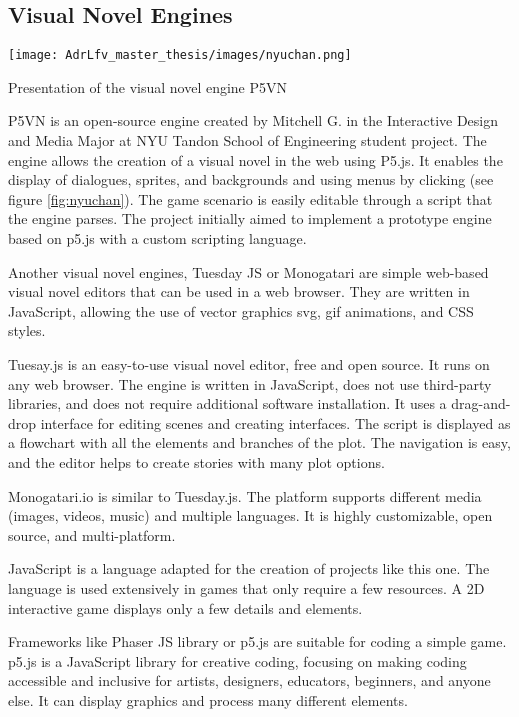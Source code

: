 \subsection{Visual Novel Engines}

\begin{marginfigure}
    \centering
    \texttt{[image: AdrLfv\_master\_thesis/images/nyuchan.png]}
    \caption{Presentation of the visual novel engine P5VN}
    \label{fig:nyuchan}
\end{marginfigure}

P5VN is an open-source engine created by Mitchell G. in the Interactive Design and Media Major at NYU Tandon School of Engineering student project. The engine allows the creation of a visual novel in the web using P5.js. It enables the display of dialogues, sprites, and backgrounds and using menus by clicking (see figure \ref{fig:nyuchan}). The game scenario is easily editable through a script that the engine parses. The project initially aimed to implement a prototype engine based on p5.js with a custom scripting language.  

Another visual novel engines, Tuesday JS \cite{TuesdayJS} or Monogatari \cite{monogatari} are simple web-based visual novel editors that can be used in a web browser. They are written in JavaScript, allowing the use of vector graphics svg, gif animations, and CSS styles.

Tuesay.js is an easy-to-use visual novel editor, free and open source. It runs on any web browser. The engine is written in JavaScript, does not use third-party libraries, and does not require additional software installation. It uses a drag-and-drop interface for editing scenes and creating interfaces. The script is displayed as a flowchart with all the elements and branches of the plot. The navigation is easy, and the editor helps to create stories with many plot options.

Monogatari.io is similar to Tuesday.js. The platform supports different media (images, videos, music) and multiple languages. It is highly customizable, open source, and multi-platform. 

JavaScript is a language adapted for the creation of projects like this one. 
The language is used extensively in games that only require a few resources. A 2D interactive game displays only a few details and elements.

Frameworks like Phaser JS library or p5.js are suitable for coding a simple game. p5.js is a JavaScript library for creative coding, focusing on making coding accessible and inclusive for artists, designers, educators, beginners, and anyone else. It can display graphics and process many different elements.

